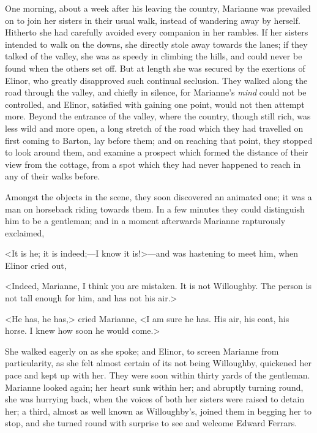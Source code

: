 One morning, about a week after his leaving the country, Marianne was prevailed on to join her sisters in their usual walk, instead of wandering away by herself. Hitherto she had carefully avoided every companion in her rambles. If her sisters intended to walk on the downs, she directly stole away towards the lanes; if they talked of the valley, she was as speedy in climbing the hills, and could never be found when the others set off. But at length she was secured by the exertions of Elinor, who greatly disapproved such continual seclusion. They walked along the road through the valley, and chiefly in silence, for Marianne's \textit{mind} could not be controlled, and Elinor, satisfied with gaining one point, would not then attempt more. Beyond the entrance of the valley, where the country, though still rich, was less wild and more open, a long stretch of the road which they had travelled on first coming to Barton, lay before them; and on reaching that point, they stopped to look around them, and examine a prospect which formed the distance of their view from the cottage, from a spot which they had never happened to reach in any of their walks before.

Amongst the objects in the scene, they soon discovered an animated one; it was a man on horseback riding towards them. In a few minutes they could distinguish him to be a gentleman; and in a moment afterwards Marianne rapturously exclaimed,

<It is he; it is indeed;—I know it is!>—and was hastening to meet him, when Elinor cried out,

<Indeed, Marianne, I think you are mistaken. It is not Willoughby. The person is not tall enough for him, and has not his air.>

<He has, he has,> cried Marianne, <I am sure he has. His air, his coat, his horse. I knew how soon he would come.>

She walked eagerly on as she spoke; and Elinor, to screen Marianne from particularity, as she felt almost certain of its not being Willoughby, quickened her pace and kept up with her. They were soon within thirty yards of the gentleman. Marianne looked again; her heart sunk within her; and abruptly turning round, she was hurrying back, when the voices of both her sisters were raised to detain her; a third, almost as well known as Willoughby's, joined them in begging her to stop, and she turned round with surprise to see and welcome Edward Ferrars.


